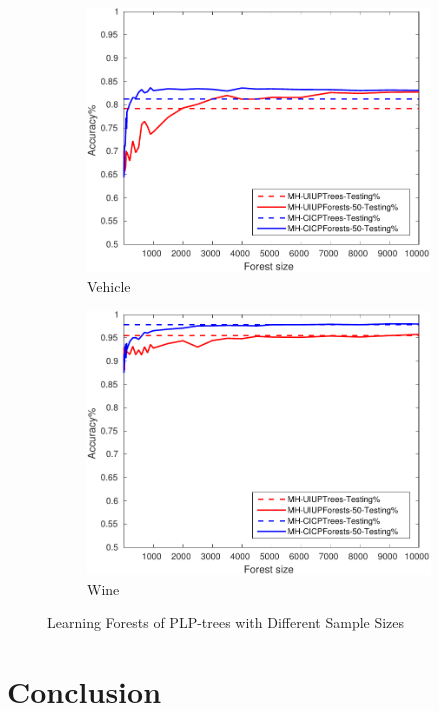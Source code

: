 \begin{figure}[ht]
\begin{subfigure}[b]{0.3\textwidth}
  	\includegraphics[width=\textwidth]{figs/PLPTF/Forests/VehicleDownsampledFurther_Forests_MH.pdf}
  	\caption{Vehicle}
		\label{fig:V4}
	\end{subfigure}
  \begin{subfigure}[b]{0.3\textwidth}
		\centering
  	\includegraphics[width=\textwidth]{figs/PLPTF/Forests/WineDownsampled_Forests_MH.pdf}
  	\caption{Wine}
		\label{fig:W4}
	\end{subfigure}

  \caption{Learning Forests of PLP-trees with Different Sample Sizes}
  \label{fig:forests2}
\end{figure}


\section{Conclusion}
